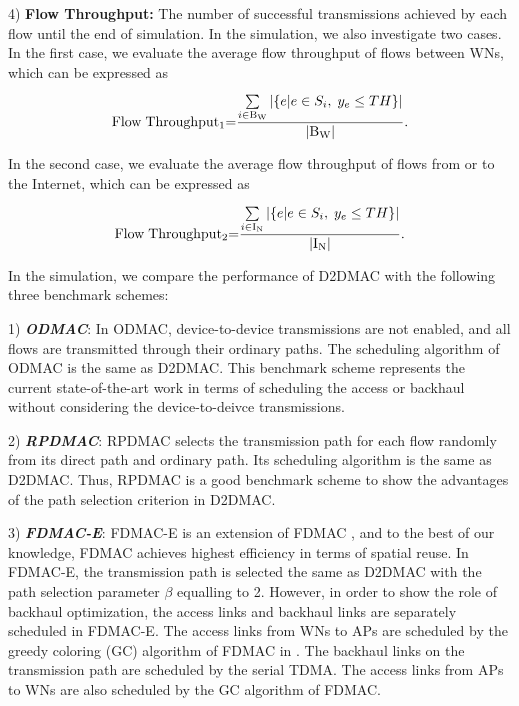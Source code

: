 \documentclass[journal]{IEEEtran}
\begin{document}
4) \textbf{Flow Throughput:} The number of successful transmissions achieved by each flow until the
end of simulation. In the simulation, we also investigate two cases. In the first case, we evaluate
the average flow throughput of flows between WNs, which can be expressed as
\begin{equation}
{\rm{Flow \;Throughpu}}{{\rm{t}}_1}{\rm{ = }}\frac{{\sum\limits_{i \in {{\rm{B_W}}}}^{} {\left| {\{
e|e \in {S_i},\;{y_e} \le TH\}} \right|} }}{{\left| {{{\rm{B_W}}}} \right|}}.
\end{equation}




In the second case, we evaluate the average flow throughput of flows from or to the Internet, which
can be expressed as
\begin{equation}
{\rm{Flow \;Throughpu}}{{\rm{t}}_2}{\rm{ = }}\frac{{\sum\limits_{i \in {{\rm{I_N}}}}^{} {\left| {\{
e|e \in {S_i},\;{y_e} \le TH\}} \right|} }}{{\left| {{{\rm{I_N}}}} \right|}}.
\end{equation}







In the simulation, we compare the performance of D2DMAC with the following three benchmark schemes:

1) \emph{\textbf{ODMAC}}: In ODMAC, device-to-device transmissions are not enabled, and all flows
are transmitted through their ordinary paths. The scheduling algorithm of ODMAC is the same as
D2DMAC. This benchmark scheme represents the current state-of-the-art work in terms of scheduling
the access or backhaul without considering the device-to-deivce
transmissions\cite{mao,60GHz-backhaul-1, 60GHz-backhaul-4}.

2) \textbf{\emph{RPDMAC}}: RPDMAC selects the transmission path for each flow randomly from its
direct path and ordinary path. Its scheduling algorithm is the same as D2DMAC. Thus, RPDMAC is a
good benchmark scheme to show the advantages of the path selection criterion in D2DMAC.


3) \textbf{\emph{FDMAC-E}}: FDMAC-E is an extension of FDMAC \cite{mao}, and to the best of our knowledge, FDMAC achieves highest efficiency in terms of spatial reuse. In FDMAC-E, the transmission path is selected the same as D2DMAC with the path selection
parameter $\beta$ equalling to 2. However, in order to show the role of backhaul optimization, the access links and backhaul links are separately scheduled in FDMAC-E. The access links from WNs to APs are scheduled by the greedy coloring (GC) algorithm of FDMAC in \cite{mao}. The backhaul links on the transmission path are scheduled by the serial TDMA. The access links from APs to WNs are also scheduled by the GC algorithm of FDMAC.
\end{document}
